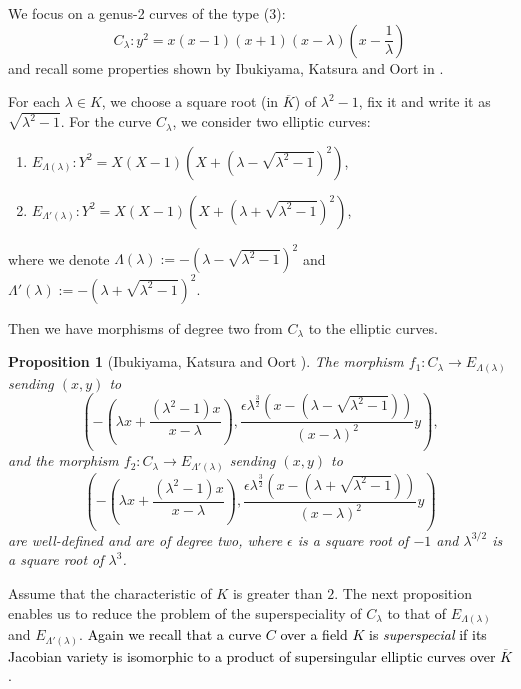 \documentclass[10pt,a4paper]{amsart}
\theoremstyle{plain}
\newtheorem{prop}[defn]{Proposition}
\newcommand{\lm}{\lambda}
\newcommand{\Lm}{\Lambda}
\begin{document}
We focus on a genus-2 curves of the type (3):
\[
C_{\lm}:y^2=x(x-1)(x+1)(x-{\lambda}) \left(x-\frac{1}{\lambda}\right)
\]
 and recall some properties shown by Ibukiyama, Katsura and Oort in \cite{IKO02}.

For each $\lambda \in K$, we choose a square root (in $\overline K$) of $\lambda^2-1$, fix it and write it as $\sqrt{\lambda^2-1}$.
For the curve $C_{\lm}$, we consider two elliptic curves:

\begin{enumerate}


\item[] $E_{\Lambda(\lm)}: Y^2=X(X-1)(X+(\lambda-\sqrt{{\lm}^2-1})^2)$,

\item[] $E_{{\Lambda}'(\lm)}: Y^2=X(X-1)(X+(\lambda+\sqrt{{\lm}^2-1})^2)$,
\end{enumerate}
where we denote $\Lm(\lm):=-(\lambda-\sqrt{{\lm}^2-1})^2$ and ${\Lm}'(\lm):=-(\lambda+\sqrt{{\lm}^2-1})^2$. 


  Then we have morphisms of degree two from $C_{\lm}$ to the elliptic curves.

   \begin{prop}[Ibukiyama, Katsura and Oort {\cite[\S 1.2]{IKO02}}]
    \label{propmapctoe}
    The morphism $ f_1: C_{\lm} \longrightarrow E_{\Lm(\lm)}$ sending $(x,y)$ to 
    \[
    \left(- \left(\lambda x +\frac{({\lambda}^2-1)x}{x-\lambda} \right), \frac{\epsilon {\lambda}^{\frac{3}{2}}(x-(\lambda-\sqrt{{\lm}^2-1}))}{(x-\lambda)^2} y\right),
    \]
    and the morphism $f_2: C_{\lm} \longrightarrow E_{{\Lm}'(\lm)}$ sending $(x,y)$ to 
    \[
    \left( - \left(\lambda x +\frac{({\lambda}^2-1)x}{x-\lambda} \right), \frac{\epsilon {\lambda}^{\frac{3}{2}}(x-(\lambda+\sqrt{{\lm}^2-1}))}{(x-\lambda)^2} y\right)
    \]
  are well-defined and are of degree two,
    where $\epsilon$ is a square root of $-1$
    and  ${\lm}^{3/2}$ is a square root of $\lm^3$.
    
\end{prop}

Assume that the characteristic of $K$ is greater than $2$.
The next proposition enables us to reduce the problem \textcolor{black}{of} the superspeciality of $C_\lm$ to that \textcolor{black}{of} $E_{\Lambda(\lm)}$ and $ E_{{\Lambda}'(\lm)}$.
\textcolor{black}{Again we recall that a curve $C$ over a field $K$ is \textit{superspecial} if its Jacobian variety is isomorphic to a product of supersingular elliptic curves over $\overline{K}$.}
   
\end{document}
